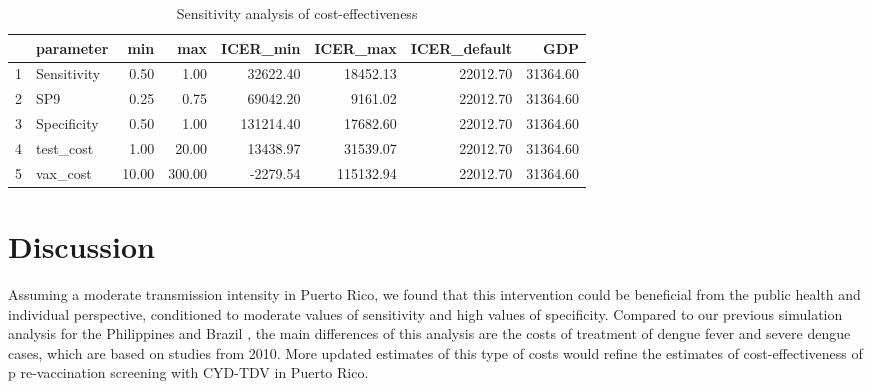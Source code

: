 \documentclass[12pt]{article}\usepackage[]{graphicx}\usepackage[]{color}
\begin{document}
\begin{table}[ht]
\centering
\begin{tabular}{rlrrrrrr}
  \hline
 & parameter & min & max & ICER\_min & ICER\_max & ICER\_default & GDP \\ 
  \hline
1 & Sensitivity & 0.50 & 1.00 & 32622.40 & 18452.13 & 22012.70 & 31364.60 \\ 
  2 & SP9 & 0.25 & 0.75 & 69042.20 & 9161.02 & 22012.70 & 31364.60 \\ 
  3 & Specificity & 0.50 & 1.00 & 131214.40 & 17682.60 & 22012.70 & 31364.60 \\ 
  4 & test\_cost & 1.00 & 20.00 & 13438.97 & 31539.07 & 22012.70 & 31364.60 \\ 
  5 & vax\_cost & 10.00 & 300.00 & -2279.54 & 115132.94 & 22012.70 & 31364.60 \\ 
   \hline
\end{tabular}
\caption{Sensitivity analysis of cost-effectiveness} 
\label{table-tornado}
\end{table}


\section{Discussion}
Assuming a moderate transmission intensity in Puerto Rico, we found that this intervention could be beneficial from the public health and individual perspective, conditioned to moderate values of sensitivity and high values of specificity. Compared to our previous simulation analysis for the Philippines and Brazil \cite{Espana2019Biorxiv}, the main differences of this analysis are the costs of treatment of dengue fever and severe dengue cases, which are based on studies from 2010. More updated estimates of this type of costs would refine the estimates of cost-effectiveness of p re-vaccination screening with CYD-TDV in Puerto Rico. 

 
 
\end{document}
